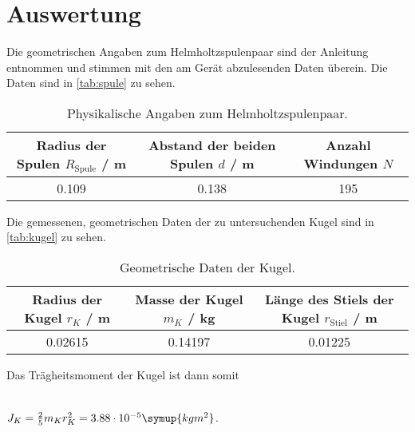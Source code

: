 \section{Auswertung}
\label{sec:Auswertung}


  Die geometrischen Angaben zum Helmholtzspulenpaar sind der Anleitung \cite[2]{V105} entnommen und stimmen mit den am Gerät  
  abzulesenden Daten überein. Die Daten sind in \autoref{tab:spule} zu sehen.
  \begin{table}[!htp]
    \centering
    \caption{Physikalische Angaben zum Helmholtzspulenpaar.}
    \label{tab:spule}
    \begin{tabular}{c c c}
    \toprule
    {Radius der Spulen $R_\text{Spule}$ / m} & {Abstand der beiden Spulen $d$ / m} & {Anzahl Windungen $N$} \\
    \midrule
    0.109 & 0.138 & 195 \\
    \bottomrule
    \end{tabular}
  \end{table}

  Die gemessenen, geometrischen Daten der zu untersuchenden Kugel sind in \autoref{tab:kugel} zu sehen.
  \begin{table}[!htp]
    \centering
    \caption{Geometrische Daten der Kugel.}
    \label{tab:kugel}
    \begin{tabular}{c c c}
    \toprule
    {Radius der Kugel $r_K$ / m} & {Masse der Kugel $m_K$ / kg} & {Länge des Stiels der Kugel  $r_\text{Stiel}$ / m}\\
    \midrule
    0.02615 & 0.14197 & 0.01225 \\
    \bottomrule
    \end{tabular}
  \end{table}
  
  Das Trägheitsmoment der Kugel ist dann somit 
  \\ \\
  \centerline{$J_K = \frac{2}{5} m_K r_K^{2} = 3.88 \cdot 10^{-5} \symup{kg m^2}$.}
  \\ \\

